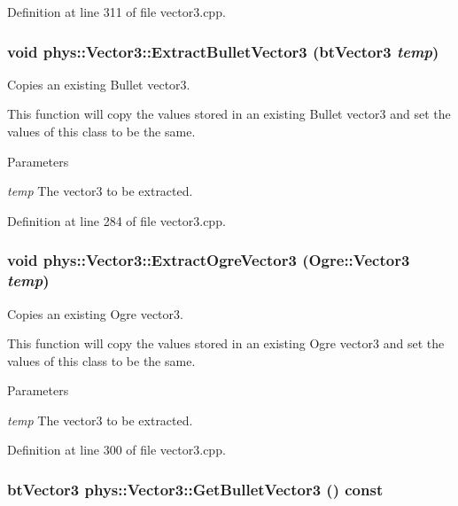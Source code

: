 Definition at line 311 of file vector3.cpp.

\hypertarget{classphys_1_1Vector3_a24ae86b068340be6727877f8c6c1a313}{
\subsubsection[{ExtractBulletVector3}]{\setlength{\rightskip}{0pt plus 5cm}void phys::Vector3::ExtractBulletVector3 (btVector3 {\em temp})}}
\label{d5/d6a/classphys_1_1Vector3_a24ae86b068340be6727877f8c6c1a313}


Copies an existing Bullet vector3. 

This function will copy the values stored in an existing Bullet vector3 and set the values of this class to be the same. 
\begin{DoxyParams}{Parameters}
\item[{\em temp}]The vector3 to be extracted. \end{DoxyParams}


Definition at line 284 of file vector3.cpp.

\hypertarget{classphys_1_1Vector3_a09a31cb8fe491f61e0cc10d21705a0df}{
\subsubsection[{ExtractOgreVector3}]{\setlength{\rightskip}{0pt plus 5cm}void phys::Vector3::ExtractOgreVector3 (Ogre::Vector3 {\em temp})}}
\label{d5/d6a/classphys_1_1Vector3_a09a31cb8fe491f61e0cc10d21705a0df}


Copies an existing Ogre vector3. 

This function will copy the values stored in an existing Ogre vector3 and set the values of this class to be the same. 
\begin{DoxyParams}{Parameters}
\item[{\em temp}]The vector3 to be extracted. \end{DoxyParams}


Definition at line 300 of file vector3.cpp.

\hypertarget{classphys_1_1Vector3_adf4129007ee41f5a03e97502f2df9c41}{
\subsubsection[{GetBulletVector3}]{\setlength{\rightskip}{0pt plus 5cm}btVector3 phys::Vector3::GetBulletVector3 () const}}
\label{d5/d6a/classphys_1_1Vector3_adf4129007ee41f5a03e97502f2df9c41}


